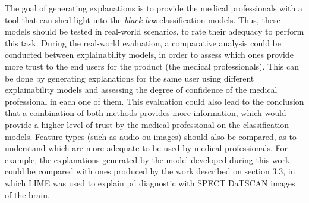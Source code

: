 The goal of generating explanations is to provide the medical professionals with a tool that can shed light into the \textit{black-box} classification models. Thus, these models should be tested in real-world scenarios, to rate their adequacy to perform this task. During the real-world evaluation, a comparative analysis could be conducted between explainability models, in order to assess which ones provide more trust to the end users for the product (the medical professionals). This can be done by generating explanations for the same user using different explainability models and assessing the degree of confidence of the medical professional in each one of them. This evaluation could also lead to the conclusion that a combination of both methods provides more information, which would provide a higher level of trust by the medical professional on the classification models. Feature types (such as audio ou images) should also be compared, as to understand which are more adequate to be used by medical professionals. For example, the explanations generated by the model developed during this work could be compared with ones produced by the work described on section 3.3, in which LIME was used to explain \gls{pd} diagnostic with SPECT DaTSCAN images of the brain. 

